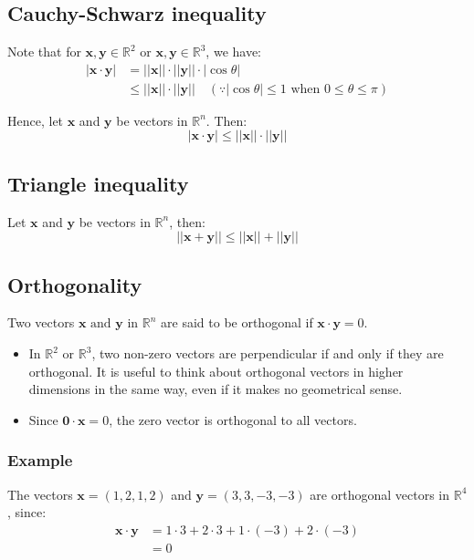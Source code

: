 \documentclass[11pt]{article}
\begin{document}
\subsection{Cauchy-Schwarz inequality}
\label{sec:org74fe536}
Note that for \(\boldsymbol{x}, \boldsymbol{y} \in \mathbb{R}^2\) or \(\boldsymbol{x}, \boldsymbol{y} \in \mathbb{R}^3\), we have:
\begin{align*}
| \boldsymbol{x} \cdot \boldsymbol{y} | &= || \boldsymbol{x} || \cdot || \boldsymbol{y} || \cdot | \cos \theta | \\
&\le || \boldsymbol{x} || \cdot || \boldsymbol{y} || \quad (\because | \cos \theta | \le 1 \text{ when } 0 \le \theta \le \pi)
\end{align*}

Hence, let \(\boldsymbol{x}\) and \(\boldsymbol{y}\) be vectors in \(\mathbb{R}^n\). Then:
\[| \boldsymbol{x} \cdot \boldsymbol{y} | \le || \boldsymbol{x} || \cdot || \boldsymbol{y} ||\]
\subsection{Triangle inequality}
\label{sec:orgcc153bf}
Let \(\boldsymbol{x}\) and \(\boldsymbol{y}\) be vectors in \(\mathbb{R}^n\), then:
\[|| \boldsymbol{x} + \boldsymbol{y} || \le || \boldsymbol{x} || + || \boldsymbol{y} ||\]
\subsection{Orthogonality}
\label{sec:orgdf52c01}
Two vectors \(\boldsymbol{x} \text{ and } \boldsymbol{y}\) in \(\mathbb{R}^n\) are said to be orthogonal if \(\boldsymbol{x} \cdot \boldsymbol{y} = 0\).


\begin{itemize}
\item In \(\mathbb{R}^2\) or \(\mathbb{R}^3\), two non-zero vectors are perpendicular if and only if they are orthogonal. It is useful to think about orthogonal vectors in higher dimensions in the same way, even if it makes no geometrical sense.
\item Since \(\boldsymbol{0} \cdot \boldsymbol{x} = 0\), the zero vector is orthogonal to all vectors.
\end{itemize}
\subsubsection{Example}
\label{sec:org5244279}
The vectors \(\boldsymbol{x} = (1, 2, 1, 2)\) and \(\boldsymbol{y} = (3, 3, -3, -3)\) are orthogonal vectors in \(\mathbb{R}^4\), since:
\begin{align*}
\boldsymbol{x} \cdot \boldsymbol{y} &= 1 \cdot 3 + 2 \cdot 3 + 1 \cdot (-3) + 2 \cdot (-3) \\
&= 0
\end{align*}
\end{document}
